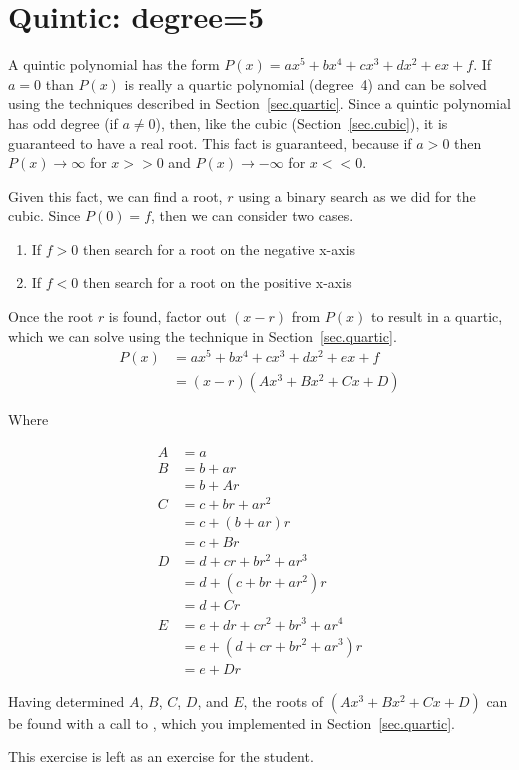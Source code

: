 \section{Quintic: degree=5}
\label{sec.quintic}

A quintic polynomial has the form $P(x) = a x^5 + b x^4 + c x^3 + d x^2 + e x + f$.
If $a=0$ than $P(x)$ is really
a quartic polynomial (degree~4) and can be solved using the techniques described in Section~\ref{sec.quartic}.
Since a quintic polynomial has odd degree (if $a\neq 0$),
then, like the cubic (Section~\ref{sec.cubic}), it is guaranteed to have a real root.  This fact
is guaranteed, because if
$a>0$ then $P(x)\to \infty$ for $x>>0$ and $P(x)\to -\infty$ for $x<<0$.

Given this fact, we can find a root, $r$ using a binary search as we did for the cubic.
Since $P(0) = f$, then we can consider two cases.
\begin{enumerate}
\item If $f>0$ then search for a root on the negative x-axis
\item If $f<0$ then search for a root on the positive x-axis
\end{enumerate}

Once the root $r$ is found, factor out $(x-r)$ from $P(x)$ to result in a quartic, which we can solve using
the technique in Section~\ref{sec.quartic}.
\begin{align*}
  P(x) &= a x^5 + b x^4 + c x^3 + d x^2 + e x + f\\
  &= (x - r) (Ax^3 + B x^2 + C x + D)
\end{align*}

Where

\begin{align*}
  A &= a\\
  B &= b + a r\\
   &= b + A r\\
  C &= c + b r + a r^2\\
  &= c + (b + a r)r\\
  &= c + B r\\
  D &= d + c r + b r^2 + a r^3\\
  &= d + ( c + b r + a r^2)r\\
  &= d + C r\\
  E &= e + d r + c r^2 + b r^3 + a r^4\\
  &= e + ( d + c r + b r^2 + a r^3)r\\
  &= e + D r
\end{align*}


Having determined $A$, $B$, $C$, $D$, and $E$, the roots of $(Ax^3 + Bx^2 + Cx + D)$ can be
found with a call to , which you implemented in Section~\ref{sec.quartic}.

This exercise is left as an exercise for the student.

